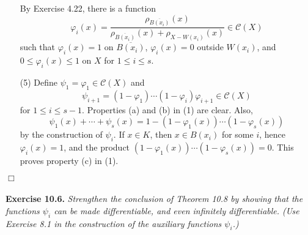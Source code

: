 \documentclass{article}
\begin{document}
\begin{enumerate}
\begin{enumerate}
  \end{enumerate}
  By Exercise 4.22, there is a function
  \[
    \varphi_i(x)
    = \frac{\rho_{\overline{B(x_i)}}(x)}{\rho_{\overline{B(x_i)}}(x) + \rho_{X-W(x_i)}(x)}
    \in \mathscr{C}(X)
  \]
  such that $\varphi_i(x) = 1$ on $\overline{B(x_i)}$,
  $\varphi_i(x) = 0$ outside $W(x_i)$, and $0 \leq \varphi_i(x) \leq 1$ on $X$
  for $1 \leq i \leq s$.

\item[(5)]
  Define $\psi_{1} = \varphi_{1} \in \mathscr{C}(X)$ and
  \[
    \psi_{i+1} = (1-\varphi_{1}) \cdots (1-\varphi_{i})\varphi_{i+1} \in \mathscr{C}(X)
  \]
  for $1 \leq i \leq s-1$.
  Properties (a) and (b) in (1) are clear.
  Also,
  \[
    \psi_1(x) + \cdots + \psi_s(x) = 1 - (1-\varphi_1(x)) \cdots (1-\varphi_s(x))
  \]
  by the construction of $\psi_i$.
  If $x \in K$, then $x \in B(x_i)$ for some $i$, hence $\varphi_i(x)=1$,
  and the product $(1-\varphi_1(x)) \cdots (1-\varphi_s(x)) = 0$.
  This proves property (c) in (1).
\end{enumerate}
$\Box$ \\\\






\textbf{Exercise 10.6.}
\emph{Strengthen the conclusion of Theorem 10.8 by showing that
the functions $\psi_i$ can be made differentiable, and even infinitely differentiable.
(Use Exercise 8.1 in the construction of the auxiliary functions $\psi_i$.)} \\
\end{document}
